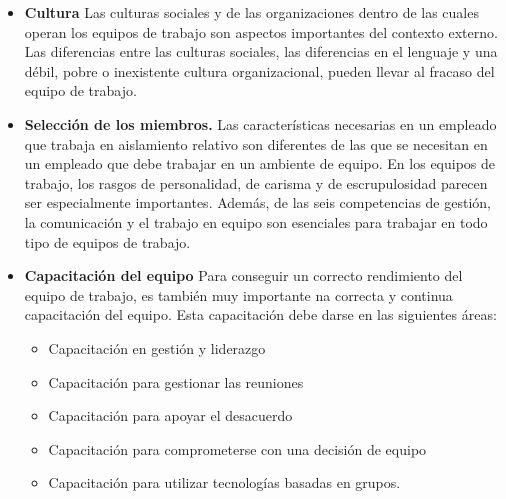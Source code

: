 \begin{itemize}
    \item \textbf{Cultura}
    Las culturas sociales y de las organizaciones dentro de las cuales
    operan los equipos de trabajo son aspectos importantes del contexto externo. Las diferencias entre las culturas sociales, las diferencias en el lenguaje y una débil, pobre o inexistente cultura organizacional, pueden llevar al fracaso del equipo de trabajo.
    
    \item \textbf{Selección de los miembros.}
    Las características necesarias en un empleado que trabaja en
    aislamiento relativo son diferentes de las que se necesitan en un
    empleado que debe trabajar en un ambiente de equipo. En los equipos
    de trabajo, los rasgos de personalidad, de carisma y de
    escrupulosidad parecen ser especialmente importantes.
    Además, de las seis competencias de gestión, la comunicación y el
    trabajo en equipo son esenciales para trabajar en todo tipo de
    equipos de trabajo.

    \item \textbf{Capacitación del equipo}
    Para conseguir un correcto rendimiento del equipo de trabajo,
    es también muy importante na correcta y continua capacitación
    del equipo. Esta capacitación debe darse en las siguientes áreas:

    \begin{itemize}
        \item Capacitación en gestión y liderazgo
        \item Capacitación para gestionar las reuniones
        \item Capacitación para apoyar el desacuerdo
        \item Capacitación para comprometerse con una decisión de equipo
        \item Capacitación para utilizar tecnologías basadas en grupos. 
    \end{itemize}
\end{itemize}
